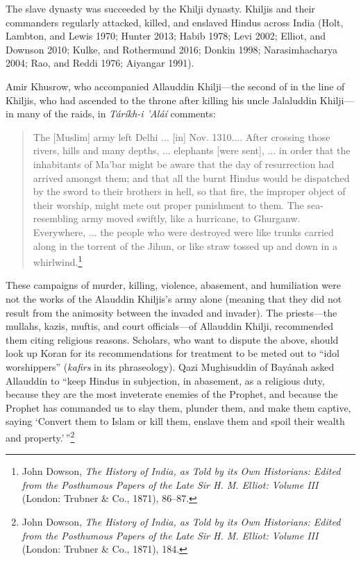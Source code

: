 The slave dynasty was succeeded by the Khilji dynasty. Khiljis and their commanders regularly attacked, killed, and enslaved Hindus across India (Holt, Lambton, and Lewis 1970; Hunter 2013; Habib 1978; Levi 2002; Elliot, and Downson 2010; Kulke, and Rothermund 2016; Donkin 1998; Narasimhacharya 2004; Rao, and Reddi 1976; Aiyangar 1991). 

Amir Khusrow, who accompanied Allauddin Khilji—the second of in the line of Khiljis, who had ascended to the throne after killing his uncle Jalaluddin Khilji—in many of the raids, in\textit{ Táríkh-i 'Aláí} comments: 
\begin{quote}
The [Muslim] army left Delhi ... [in] Nov. 1310.... After crossing those rivers, hills and many depths, ... elephants [were sent], ... in order that the inhabitants of Ma'bar might be aware that the day of resurrection had arrived amongst them; and that all the burnt Hindus would be dispatched by the sword to their brothers in hell, so that fire, the improper object of their worship, might mete out proper punishment to them. The sea-resembling army moved swiftly, like a hurricane, to Ghurganw. Everywhere, ... the people who were destroyed were like trunks carried along in the torrent of the Jihun, or like straw tossed up and down in a whirlwind.\footnote{John Dowson, \textit{The History of India, as Told by its Own Historians: Edited from the Posthumous Papers of the Late Sir H. M. Elliot: Volume III} (London: Trubner \& Co., 1871), 86--87.}
\end{quote}
These campaigns of murder, killing, violence, abasement, and humiliation were not the works of the Alauddin Khiljis’s army alone (meaning that they did not result from the animosity between the invaded and invader). The priests—the mullahs, kazis, muftis, and court officials—of Allauddin Khilji, recommended them citing religious reasons. Scholars, who want to dispute the above, should look up Koran for its recommendations for treatment to be meted out to “idol worshippers” (\textit{kafirs} in its phraseology). Qazi Mughisuddin of Bayánah asked Allauddin to “keep Hindus in subjection, in abasement, as a religious duty, because they are the most inveterate enemies of the Prophet, and because the Prophet has commanded us to slay them, plunder them, and make them captive, saying ‘Convert them to Islam or kill them, enslave them and spoil their wealth and property.’\,”\footnote{John Dowson, \textit{The History of India, as Told by its Own Historians: Edited from the Posthumous Papers of the Late Sir H. M. Elliot: Volume III} (London: Trubner \& Co., 1871), 184.}

